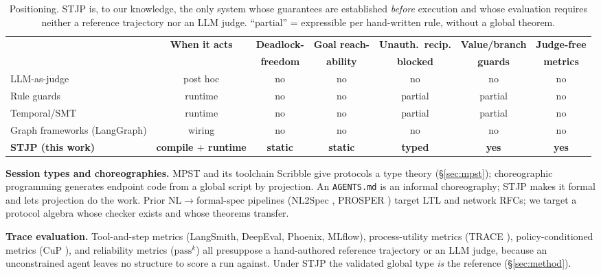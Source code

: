 \documentclass{article}
\newcommand{\stjp}{\textsc{STJP}}
\begin{document}
\begin{table}[t]
\centering\small
\caption{Positioning. \stjp{} is, to our knowledge, the only system whose guarantees are established \emph{before} execution and whose evaluation requires neither a reference trajectory nor an LLM judge. ``partial'' = expressible per hand-written rule, without a global theorem.}
\label{tab:position}
\begin{tabular}{@{}lcccccc@{}}
\toprule
& \textbf{When it acts} & \textbf{Deadlock-} & \textbf{Goal reach-} & \textbf{Unauth.\ recip.} & \textbf{Value/branch} & \textbf{Judge-free} \\
& & \textbf{freedom} & \textbf{ability} & \textbf{blocked} & \textbf{guards} & \textbf{metrics} \\
\midrule
LLM-as-judge & post hoc & no & no & no & no & no \\
Rule guards \citep{agentspec} & runtime & no & no & partial & partial & no \\
Temporal/SMT \citep{agentc} & runtime & no & no & partial & partial & no \\
Graph frameworks (LangGraph) & wiring & no & no & no & no & no \\
\textbf{\stjp{} (this work)} & \textbf{compile $+$ runtime} & \textbf{static} & \textbf{static} & \textbf{typed} & \textbf{yes} & \textbf{yes} \\
\bottomrule
\end{tabular}
\end{table}

\textbf{Session types and choreographies.} MPST \citep{hyc08,scalas19} and its toolchain Scribble \citep{scribble} give protocols a type theory (\S\ref{sec:mpst}); choreographic programming \citep{montesi23,carbone13} generates endpoint code from a global script by projection. An \texttt{AGENTS.md} is an informal choreography; \stjp{} makes it formal and lets projection do the work. Prior NL$\to$formal-spec pipelines (NL2Spec \citep{nl2spec}, PROSPER \citep{prosper}) target LTL and network RFCs; we target a protocol algebra whose checker exists and whose theorems transfer.

\textbf{Trace evaluation.} Tool-and-step metrics (LangSmith, DeepEval, Phoenix, MLflow), process-utility metrics (TRACE \citep{trace}), policy-conditioned metrics (CuP \citep{stweb}), and reliability metrics ($\mathrm{pass}^k$) all presuppose a hand-authored reference trajectory or an LLM judge, because an unconstrained agent leaves no structure to score a run against. Under \stjp{} the validated global type \emph{is} the reference (\S\ref{sec:method}).
\end{document}
